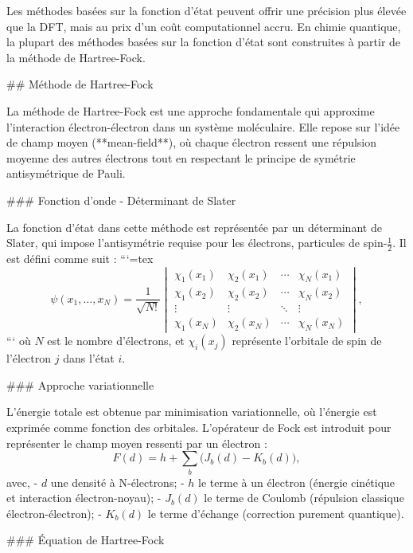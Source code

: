 \documentclass[12pt,a4paper]{report}
\numberwithin{equation}{section}
\numberwithin{figure}{section}
\numberwithin{table}{section}
\begin{document}
\begin{markdown}
Les méthodes basées sur la fonction d'état peuvent offrir une précision plus élevée que la DFT, mais au prix d'un coût computationnel accru. En chimie quantique, la plupart des méthodes basées sur la fonction d'état sont construites à partir de la méthode de Hartree-Fock.

## Méthode de Hartree-Fock

La méthode de Hartree-Fock est une approche fondamentale qui approxime l’interaction électron-électron dans un système moléculaire. Elle repose sur l'idée de champ moyen (**mean-field**), où chaque électron ressent une répulsion moyenne des autres électrons tout en respectant le principe de symétrie antisymétrique de Pauli.

### Fonction d'onde - Déterminant de Slater

La fonction d'état dans cette méthode est représentée par un déterminant de Slater, qui impose l'antisymétrie requise pour les électrons, particules de spin-$\frac12$. Il est défini comme suit :
```{=tex}
\begin{equation}
\psi(x_1, \ldots, x_N) = \frac{1}{\sqrt{N!}}
\begin{vmatrix}
\chi_1(x_1) & \chi_2(x_1) & \cdots & \chi_N(x_1) \\
\chi_1(x_2) & \chi_2(x_2) & \cdots & \chi_N(x_2) \\
\vdots & \vdots & \ddots & \vdots \\
\chi_1(x_N) & \chi_2(x_N) & \cdots & \chi_N(x_N)
\end{vmatrix} ,
\end{equation}
```
où $N$ est le nombre d'électrons, et $\chi_i(x_j)$ représente l'orbitale de spin de l'électron $j$ dans l'état $i$.

### Approche variationnelle

L’énergie totale est obtenue par minimisation variationnelle, où l'énergie est exprimée comme fonction des orbitales. L'opérateur de Fock est introduit pour représenter le champ moyen ressenti par un électron :
\begin{equation}
F(d) = h + \sum_b \big(J_b(d) - K_b(d)\big) ,
\end{equation}
avec,
- $d$ une densité à N-électrons;
- $h$ le terme à un électron (énergie cinétique et interaction électron-noyau);
- $J_b(d)$ le terme de Coulomb (répulsion classique électron-électron);
- $K_b(d)$ le terme d'échange (correction purement quantique).

### Équation de Hartree-Fock


\end{markdown}
\end{document}
